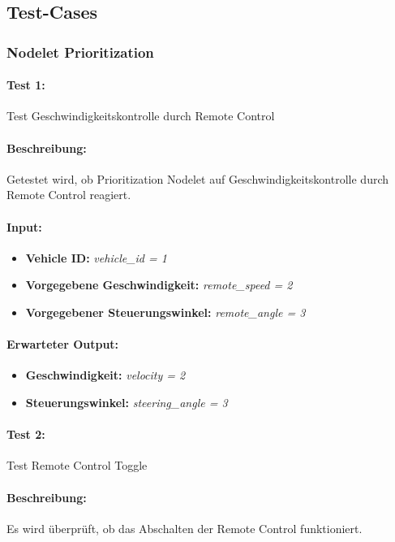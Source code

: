 \documentclass[a4paper, 12pt, titlepage]{scrartcl}
\begin{document}
		\subsection{Test-Cases}
		\label{test_cases}
			\subsubsection{Nodelet Prioritization}
			\label{node_prioritization}
				\paragraph{Test 1:}{Test Geschwindigkeitskontrolle durch Remote Control}
				\paragraph{Beschreibung:} Getestet wird, ob Prioritization Nodelet auf Geschwindigkeitskontrolle durch Remote Control reagiert.
				\paragraph{Input:}
				\begin{itemize} \itemsep-0.5em
					\item \textbf{Vehicle ID:} \emph{vehicle\_id = 1}
					\item \textbf{Vorgegebene Geschwindigkeit:} \emph{remote\_speed = 2}
					\item \textbf{Vorgegebener Steuerungswinkel:} \emph{remote\_angle = 3}
				\end{itemize}
				\paragraph{Erwarteter Output:}
				\begin{itemize} \itemsep-0.5em
					\item \textbf{Geschwindigkeit:} \emph{velocity = 2}
					\item \textbf{Steuerungswinkel:} \emph{steering\_angle = 3}
				\end{itemize}
				\paragraph{Test 2:}{Test Remote Control Toggle}
				\paragraph{Beschreibung:} Es wird überprüft, ob das Abschalten der Remote Control funktioniert.
\end{document}
